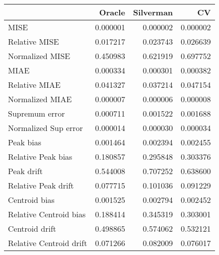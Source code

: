 \begin{tabular}{lrrr}
  \toprule
 & Oracle & Silverman & CV \\ 
  \midrule
MISE & 0.000001 & 0.000002 & 0.000002 \\ 
  Relative MISE & 0.017217 & 0.023743 & 0.026639 \\ 
  Normalized MISE & 0.450983 & 0.621919 & 0.697752 \\ 
  MIAE & 0.000334 & 0.000301 & 0.000382 \\ 
  Relative MIAE & 0.041327 & 0.037214 & 0.047154 \\ 
  Normalized MIAE & 0.000007 & 0.000006 & 0.000008 \\ 
  Supremum error & 0.000711 & 0.001522 & 0.001688 \\ 
  Normalized Sup error & 0.000014 & 0.000030 & 0.000034 \\ 
  Peak bias & 0.001464 & 0.002394 & 0.002455 \\ 
  Relative Peak bias & 0.180857 & 0.295848 & 0.303376 \\ 
  Peak drift & 0.544008 & 0.707252 & 0.638600 \\ 
  Relative Peak drift & 0.077715 & 0.101036 & 0.091229 \\ 
  Centroid bias & 0.001525 & 0.002794 & 0.002452 \\ 
  Relative Centroid bias & 0.188414 & 0.345319 & 0.303001 \\ 
  Centroid drift & 0.498865 & 0.574062 & 0.532121 \\ 
  Relative Centroid drift & 0.071266 & 0.082009 & 0.076017 \\ 
   \bottomrule
\end{tabular}
